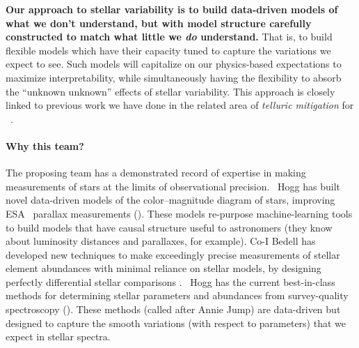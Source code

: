 \documentclass[12pt, letterpaper]{article}
\begin{document}

\textbf{Our approach to stellar variability is to build data-driven models of what
we don't understand, but with model structure carefully constructed to
match what little we \emph{do} understand.}
That is, to build flexible models which have their capacity tuned to
capture the variations we expect to see. 
Such models will capitalize on our physics-based expectations to
maximize interpretability, while simultaneously having the flexibility to absorb 
the ``unknown unknown'' effects of stellar variability.
This approach is closely linked to previous work we have done in the related 
area of \textit{telluric mitigation} for \EPRV\ \citep{Bedell2019}.

\paragraph{Why this team?}
The proposing team has a demonstrated record of expertise in making
measurements of stars at the limits of observational precision. 
\PI\ Hogg has built novel data-driven models of the color--magnitude diagram of
stars, improving ESA \Gaia\ parallax measurements (\citealt{Leistedt, Widmark, Anderson}).
These models re-purpose machine-learning tools to build models that
have causal structure useful to astronomers (they know about
luminosity distances and parallaxes, for example).
Co-I Bedell has developed new techniques to make exceedingly
precise measurements of stellar element abundances with minimal
reliance on stellar models, by designing perfectly differential stellar
comparisons \citep{Bedell2014, Bedell2018}.
\PI\ Hogg has the current best-in-class methods for determining stellar
parameters and abundances from survey-quality spectroscopy (\citealt{Cannon2, Doppel}).
These methods (called  after Annie Jump) are
data-driven but designed to capture the smooth variations (with
respect to parameters) that we expect in stellar spectra.
\end{document}
